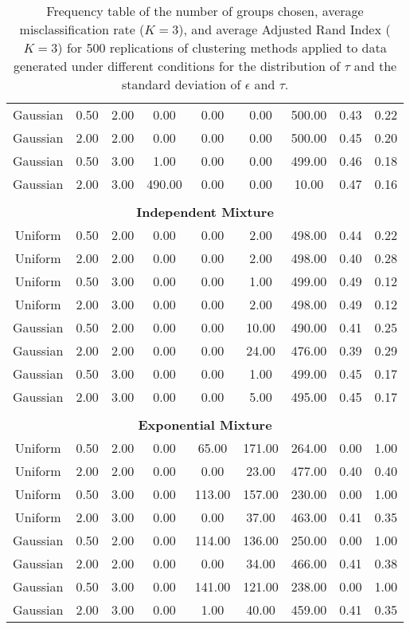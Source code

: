 \begin{table}[ht]
\begin{center}
\begin{tabular}{ccc|cccccc}
  Gaussian & 0.50 & 2.00 & 0.00 & 0.00 & 0.00 & 500.00 & 0.43 & 0.22 \\ 
  Gaussian & 2.00 & 2.00 & 0.00 & 0.00 & 0.00 & 500.00 & 0.45 & 0.20 \\ 
  Gaussian & 0.50 & 3.00 & 1.00 & 0.00 & 0.00 & 499.00 & 0.46 & 0.18 \\ 
  Gaussian & 2.00 & 3.00 & 490.00 & 0.00 & 0.00 & 10.00 & 0.47 & 0.16 \\ 
   \\ \multicolumn{9}{c}{\textbf{Independent Mixture}}\\Uniform & 0.50 & 2.00 & 0.00 & 0.00 & 2.00 & 498.00 & 0.44 & 0.22 \\ 
  Uniform & 2.00 & 2.00 & 0.00 & 0.00 & 2.00 & 498.00 & 0.40 & 0.28 \\ 
  Uniform & 0.50 & 3.00 & 0.00 & 0.00 & 1.00 & 499.00 & 0.49 & 0.12 \\ 
  Uniform & 2.00 & 3.00 & 0.00 & 0.00 & 2.00 & 498.00 & 0.49 & 0.12 \\ 
  Gaussian & 0.50 & 2.00 & 0.00 & 0.00 & 10.00 & 490.00 & 0.41 & 0.25 \\ 
  Gaussian & 2.00 & 2.00 & 0.00 & 0.00 & 24.00 & 476.00 & 0.39 & 0.29 \\ 
  Gaussian & 0.50 & 3.00 & 0.00 & 0.00 & 1.00 & 499.00 & 0.45 & 0.17 \\ 
  Gaussian & 2.00 & 3.00 & 0.00 & 0.00 & 5.00 & 495.00 & 0.45 & 0.17 \\ 
   \\ \multicolumn{9}{c}{\textbf{Exponential Mixture}}\\Uniform & 0.50 & 2.00 & 0.00 & 65.00 & 171.00 & 264.00 & 0.00 & 1.00 \\ 
  Uniform & 2.00 & 2.00 & 0.00 & 0.00 & 23.00 & 477.00 & 0.40 & 0.40 \\ 
  Uniform & 0.50 & 3.00 & 0.00 & 113.00 & 157.00 & 230.00 & 0.00 & 1.00 \\ 
  Uniform & 2.00 & 3.00 & 0.00 & 0.00 & 37.00 & 463.00 & 0.41 & 0.35 \\ 
  Gaussian & 0.50 & 2.00 & 0.00 & 114.00 & 136.00 & 250.00 & 0.00 & 1.00 \\ 
  Gaussian & 2.00 & 2.00 & 0.00 & 0.00 & 34.00 & 466.00 & 0.41 & 0.38 \\ 
  Gaussian & 0.50 & 3.00 & 0.00 & 141.00 & 121.00 & 238.00 & 0.00 & 1.00 \\ 
  Gaussian & 2.00 & 3.00 & 0.00 & 1.00 & 40.00 & 459.00 & 0.41 & 0.35 \\ 
   \hline\end{tabular}
\caption{Frequency table of the number of groups chosen, average misclassification rate ($K=3$), and average Adjusted Rand Index ($K=3$) for 500 replications of clustering methods applied to data generated under different conditions for the distribution of $\tau$ and the standard deviation of $\epsilon$ and $\tau$.}
\label{tab:freq1}
\end{center}
\end{table}

